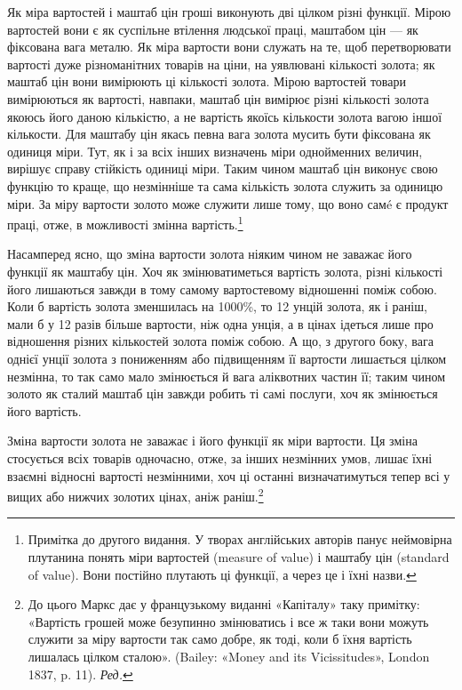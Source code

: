 Як міра вартостей і маштаб цін гроші виконують дві цілком
різні функції. Мірою вартостей вони є як суспільне втілення
людської праці, маштабом цін — як фіксована вага металю.
Як міра вартости вони служать на те, щоб перетворювати вартості
дуже різноманітних товарів на ціни, на уявлювані кількості
золота; як маштаб цін вони вимірюють ці кількості золота. Мірою
вартостей товари вимірюються як вартості, навпаки, маштаб
цін вимірює різні кількості золота якоюсь його даною кількістю,
а не вартість якоїсь кількости золота вагою іншої кількости.
Для маштабу цін якась певна вага золота мусить бути фіксована
як одиниця міри. Тут, як і за всіх інших визначень міри однойменних
величин, вирішує справу стійкість одиниці міри. Таким
чином маштаб цін виконує свою функцію то краще, що незмінніше
та сама кількість золота служить за одиницю міри. За міру
вартости золото може служити лише тому, що воно самé є продукт
праці, отже, в можливості змінна вартість.\footnote{
Примітка до другого видання. У творах англійських авторів
панує неймовірна плутанина понять міри вартостей (measure of value)
і маштабу цін (standard of value). Вони постійно плутають ці функції,
а через це і їхні назви.
}

Насамперед ясно, що зміна вартости золота ніяким чином не
заважає його функції як маштабу цін. Хоч як змінюватиметься
вартість золота, різні кількості його лишаються завжди в тому
самому вартостевому відношенні поміж собою. Коли б вартість
золота зменшилась на 1000\%, то 12 унцій золота, як і раніш, мали б
у 12 разів більше вартости, ніж одна унція, а в цінах ідеться
лише про відношення різних кількостей золота поміж собою.
А що, з другого боку, вага однієї унції золота з пониженням
або підвищенням її вартости лишається цілком незмінна, то так
само мало змінюється й вага аліквотних частин її; таким чином
золото як сталий маштаб цін завжди робить ті самі послуги, хоч
як змінюється його вартість.

Зміна вартости золота не заважає і його функції як міри вартости.
Ця зміна стосується всіх товарів одночасно, отже, за інших
незмінних умов, лишає їхні взаємні відносні вартості незмінними,
хоч ці останні визначатимуться тепер всі у вищих або
нижчих золотих цінах, аніж раніш.\footnote*{
До цього Маркс дає у французькому виданні «Капіталу» таку примітку:
«Вартість грошей може безупинно змінюватись і все ж таки вони
можуть служити за міру вартости так само добре, як тоді, коли б їхня
вартість лишалась цілком сталою». (Bailey: «Money and its Vicissitudes»,
London 1837, p. 11). \emph{Ред.}
}

